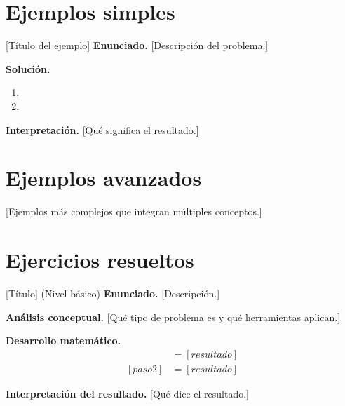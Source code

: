 \section{Ejemplos simples}
\label{sec:[etiqueta]-ejemplos-simples}

\begin{ejemplo}{[Título del ejemplo]}
  \textbf{Enunciado.} [Descripción del problema.]

  \textbf{Solución.}
  \begin{enumerate}
    \item [Paso 1]
    \item [Paso 2]
  \end{enumerate}

  \textbf{Interpretación.} [Qué significa el resultado.]
\end{ejemplo}

\section{Ejemplos avanzados}
\label{sec:[etiqueta]-ejemplos-avanzados}

[Ejemplos más complejos que integran múltiples conceptos.]


\section{Ejercicios resueltos}
\label{sec:[etiqueta]-ejercicios-resueltos}

\begin{ejercicioresuelto}{[Título] (Nivel básico)}
  \textbf{Enunciado.} [Descripción.]

  \textbf{Análisis conceptual.} [Qué tipo de problema es y qué herramientas aplican.]

  \textbf{Desarrollo matemático.}
  \begin{align*}
    [paso 1] &= [resultado] \\
    [paso 2] &= [resultado]
  \end{align*}

  \textbf{Interpretación del resultado.} [Qué dice el resultado.]
\end{ejercicioresuelto}

